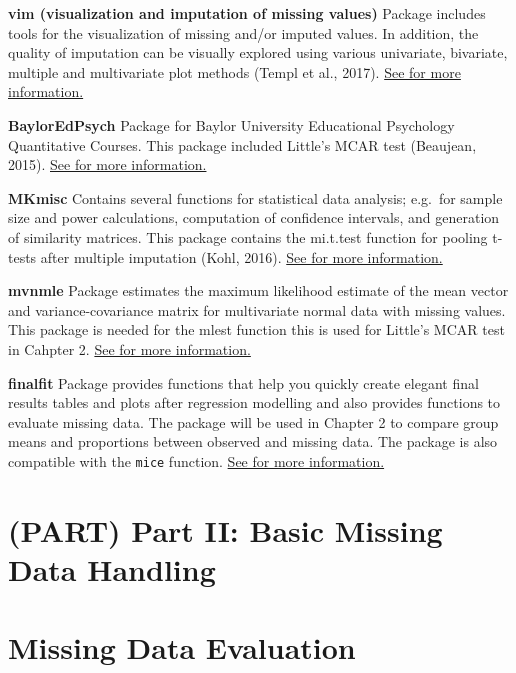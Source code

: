 \documentclass[
]{book}
\begin{document}
\textbf{vim (visualization and imputation of missing values)} Package
includes tools for the visualization of missing and/or imputed values.
In addition, the quality of imputation can be visually explored using
various univariate, bivariate, multiple and multivariate plot methods
(Templ et al., 2017).
\href{https://cran.r-project.org/web/packages/mi/index.html}{See for
more information.}

\textbf{BaylorEdPsych} Package for Baylor University Educational
Psychology Quantitative Courses. This package included Little's MCAR
test (Beaujean, 2015).
\href{https://cran.r-project.org/web/packages/BaylorEdPsych/index.html}{See
for more information.}

\textbf{MKmisc} Contains several functions for statistical data
analysis; e.g.~for sample size and power calculations, computation of
confidence intervals, and generation of similarity matrices. This
package contains the mi.t.test function for pooling t-tests after
multiple imputation (Kohl, 2016).
\href{https://cran.r-project.org/web/packages/MKmisc/index.html}{See for
more information.}

\textbf{mvnmle} Package estimates the maximum likelihood estimate of the
mean vector and variance-covariance matrix for multivariate normal data
with missing values. This package is needed for the mlest function this
is used for Little's MCAR test in Cahpter 2.
\href{https://cran.r-project.org/web/packages/mvnmle/index.html}{See for
more information.}

\textbf{finalfit} Package provides functions that help you quickly
create elegant final results tables and plots after regression modelling
and also provides functions to evaluate missing data. The package will
be used in Chapter 2 to compare group means and proportions between
observed and missing data. The package is also compatible with the
\texttt{mice} function. \href{https://finalfit.org/index.html}{See for
more information.}

\hypertarget{part-part-ii-basic-missing-data-handling}{%
\chapter*{(PART) Part II: Basic Missing Data
Handling}\label{part-part-ii-basic-missing-data-handling}}

\hypertarget{missing-data-evaluation}{%
\chapter{Missing Data Evaluation}\label{missing-data-evaluation}}
\end{document}
